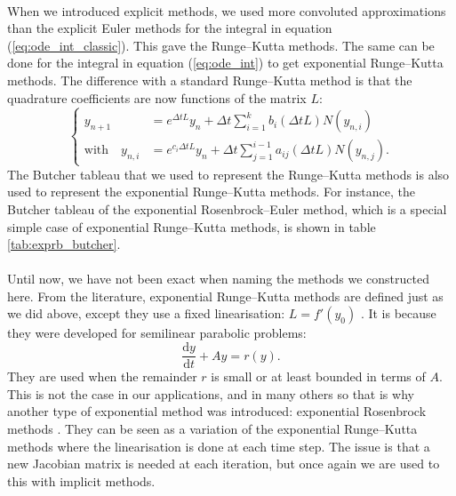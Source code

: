     \paragraph{}
    When we introduced explicit methods, we used more convoluted approximations than the explicit Euler methods for the integral in equation (\ref{eq:ode_int_classic}).
    This gave the Runge--Kutta methods.
    The same can be done for the integral in equation (\ref{eq:ode_int}) to get exponential Runge--Kutta methods.
    The difference with a standard Runge--Kutta method is that the quadrature coefficients are now functions of the matrix $L$:
    \begin{equation}
      \left\{\begin{aligned}
        y_{n+1} &= e^{\Delta t L} y_n + \Delta t \sum_{i = 1}^k b_i\left(\Delta t L\right) N\left(y_{n,i}\right) \\
        \textrm{with}\quad y_{n,i} &= e^{c_i \Delta t L} y_n + \Delta t \sum_{j = 1}^{i-1} a_{ij}\left(\Delta t L\right) N\left(y_{n,j}\right) .
      \end{aligned}\right.
    \end{equation}
    The Butcher tableau that we used to represent the Runge--Kutta methods is also used to represent the exponential Runge--Kutta methods.
    For instance, the Butcher tableau of the exponential Rosenbrock--Euler method, which is a special simple case of exponential Runge--Kutta methods, is shown in table \ref{tab:exprb_butcher}.

    \paragraph{}
    Until now, we have not been exact when naming the methods we constructed here.
    From the literature, exponential Runge--Kutta methods are defined just as we did above, except they use a fixed linearisation: $L = f'\left(y_0\right)$ \cite{HochbruckOstermann2005}.
    It is because they were developed for semilinear parabolic problems:
    \begin{equation}
      \frac{\mathrm{d} y}{\mathrm{d} t} + Ay = r\left(y\right) .
    \end{equation}
    They are used when the remainder $r$ is small or at least bounded in terms of $A$.
    This is not the case in our applications, and in many others so that is why another type of exponential method was introduced: exponential Rosenbrock methods \cite{HochbruckOstermannSchweitzer2006}.
    They can be seen as a variation of the exponential Runge--Kutta methods where the linearisation is done at each time step.
    The issue is that a new Jacobian matrix is needed at each iteration, but once again we are used to this with implicit methods.


